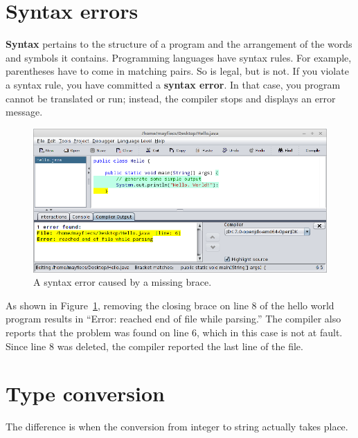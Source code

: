 

\section{Syntax errors}


{\bf Syntax} pertains to the structure of a program and the arrangement of the words and symbols it contains.
Programming languages have syntax rules.
For example, parentheses have to come in matching pairs.
So  is legal, but  is not.
If you violate a syntax rule, you have committed a {\bf syntax error}.
In that case, you program cannot be translated or run; instead, the compiler stops and displays an error message.

\begin{figure}[!h]
\begin{center}
\includegraphics[width=\textwidth]{figs/syntax-error.png}
\caption{A syntax error caused by a missing brace.}
\label{fig:syntax}
\end{center}
\end{figure}

As shown in Figure~\ref{fig:syntax}, removing the closing brace on line 8 of the hello world program results in ``Error: reached end of file while parsing.''
The compiler also reports that the problem was found on line 6, which in this case is not at fault.
Since line 8 was deleted, the compiler reported the last line of the file.


\section{Type conversion}

The difference is when the conversion from integer to string actually takes place.

